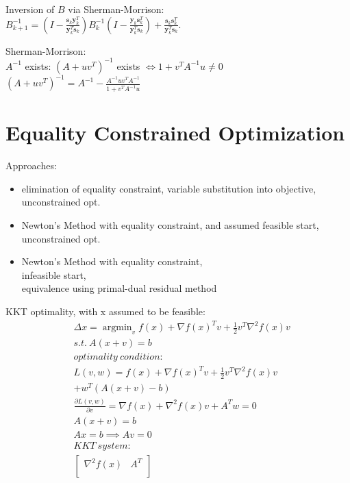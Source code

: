 \documentclass[8pt]{report}
\DeclareMathOperator*{\argmin}{argmin}
\begin{document}
\begin{multicols*}{2}
  Inversion of $B$ via Sherman-Morrison:\\
  ${\displaystyle B_{k+1}^{-1}=\left(I-{\frac {\mathbf {s} _{k}\mathbf {y} _{k}^{T}}{\mathbf {y} _{k}^{T}\mathbf {s} _{k}}}\right)B_{k}^{-1}\left(I-{\frac {\mathbf {y} _{k}\mathbf {s} _{k}^{T}}{\mathbf {y} _{k}^{T}\mathbf {s} _{k}}}\right)+{\frac {\mathbf {s} _{k}\mathbf {s} _{k}^{T}}{\mathbf {y} _{k}^{T}\mathbf {s} _{k}}}.}$

  Sherman-Morrison:\\
  $A^{-1}$ exists: $(A+uv^T)^{-1}$ exists $\iff 1+v^TA^{-1}u \not=0$\\
  $(A+uv^T)^{-1}=A^{-1} - \frac{A^{-1}uv^T A^{-1}}{1+v^TA^{-1}u}$\\
  
  \vfill\null
  \pagebreak
  \section{Equality Constrained Optimization}
  Approaches:
  \begin{itemize}
  \item elimination of equality constraint, variable substitution into objective, unconstrained opt.
  \item Newton's Method with equality constraint, and assumed feasible start, unconstrained opt.
  \item Newton's Method with equality constraint,\\ infeasible start,\\ equivalence using primal-dual residual method
  \end{itemize}  
  KKT optimality, with x assumed to be feasible:
  \begin{align*}
    &\Delta x = \argmin_v f(x) + \nabla f(x)^T v + \frac{1}{2} v^T \nabla^2 f(x) v\\
    &s.t.\ A(x+v)=b\\
    &optimality\ condition:\\
    &L(v,w) = f(x) + \nabla f(x)^T v + \frac{1}{2} v^T \nabla^2 f(x) v\\
    &+ w^T(A(x+v)-b)\\
    &\frac{\partial L(v,w)}{\partial v} = \nabla f(x) + \nabla^2 f(x) v + A^T w = 0\\
    &A(x+v) = b\\
    &Ax = b \implies Av = 0\\
    & KKT\ system:\\
    &\begin{bmatrix}
        \nabla^2 f(x) & A^T \\

\end{bmatrix}
\end{align*}
\end{multicols*}
\end{document}
